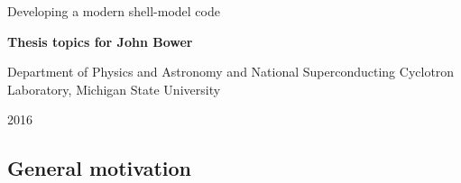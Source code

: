 \documentclass[%
oneside,                 %
final,                   %
10pt]{article}
\begin{document}

\newcommand{\exercisesection}[1]{\subsection*{#1}}






\thispagestyle{empty}

\begin{center}
{\LARGE\bf
\begin{spacing}{1.25}
Developing a modern shell-model code
\end{spacing}
}
\end{center}


\begin{center}
{\bf Thesis topics for John Bower}
\end{center}

    \begin{center}
\centerline{{\small Department of Physics and Astronomy and National Superconducting Cyclotron Laboratory, Michigan State University}}
\end{center}
    

\begin{center}
2016
\end{center}

\vspace{1cm}


\subsection*{General motivation}

\end{document}
